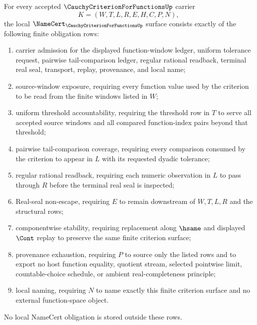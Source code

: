 \begin{theorem}\label{thm:cauchy-criterion-for-functions-namecert-obligations}
For every accepted $\CauchyCriterionForFunctionsUp$ carrier
$$
K=(W,T,L,R,E,H,C,P,N),
$$
the local $\NameCert_{\CauchyCriterionForFunctionsUp}$ surface consists exactly of the following finite obligation rows:
\begin{enumerate}
\item carrier admission for the displayed function-window ledger, uniform tolerance request, pairwise tail-comparison ledger, regular rational readback, terminal real seal, transport, replay, provenance, and local name;
\item source-window exposure, requiring every function value used by the criterion to be read from the finite windows listed in $W$;
\item uniform threshold accountability, requiring the threshold row in $T$ to serve all accepted source windows and all compared function-index pairs beyond that threshold;
\item pairwise tail-comparison coverage, requiring every comparison consumed by the criterion to appear in $L$ with its requested dyadic tolerance;
\item regular rational readback, requiring each numeric observation in $L$ to pass through $R$ before the terminal real seal is inspected;
\item Real-seal non-escape, requiring $E$ to remain downstream of $W,T,L,R$ and the structural rows;
\item componentwise stability, requiring replacement along $\hsame$ and displayed $\Cont$ replay to preserve the same finite criterion surface;
\item provenance exhaustion, requiring $P$ to source only the listed rows and to export no host function equality, quotient stream, selected pointwise limit, countable-choice schedule, or ambient real-completeness principle;
\item local naming, requiring $N$ to name exactly this finite criterion surface and no external function-space object.
\end{enumerate}
No local NameCert obligation is stored outside these rows.
\end{theorem}

